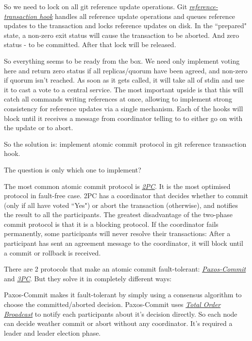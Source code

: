 \documentclass[acmlarge, screen, nonacm]{acmart}
\begin{document}
So we need to lock on all git reference update operations.
Git \emph{\href{https://git-scm.com/docs/githooks.html\#_reference_transaction}{reference-transaction hook}}
handles all reference update operations and queues reference updates to the transaction and locks reference updates on disk.
In the ``prepared" state, a non-zero exit status will cause the transaction to be aborted.
And zero status - to be committed.
After that lock will be released.

So everything seems to be ready from the box.
We need only implement voting here and return zero status if all replicas/quorum have been agreed, and non-zero if quorum isn't reached.
As soon as it gets called, it will take all
of stdin and use it to cast a vote to a central service.
The most important upside is that this will catch all commands writing
references at once, allowing to implement strong consistency for
reference updates via a single mechanism.
Each of the hooks will block until it receives a message from coordinator telling to to either go on with the update or to abort.

So the solution is: implement atomic commit protocol in git reference transaction hook.

The question is only which one to implement?

The most common atomic commit protocol is
\emph{\href{https://en.wikipedia.org/wiki/Two-phase_commit_protocol}{2PC}}.
It is the most optimised protocol in fault-free case.
2PC has a coordinator that decides whether to commit (only if all have voted ``Yes") or abort the transaction (otherwise),
and notifies the result to all the participants.
The greatest disadvantage of the two-phase commit protocol is that it is a blocking protocol.
If the coordinator fails permanently, some participants will never resolve their transactions:
After a participant has sent an agreement message to the coordinator, it will block until a commit or rollback is received.

There are 2 protocols that make an atomic commit fault-tolerant:
\emph{\href{https://dsf.berkeley.edu/cs286/papers/paxoscommit-tods2006.pdf}{Paxos-Commit}}
and
\emph{\href{https://en.wikipedia.org/wiki/Three-phase_commit_protocol}{3PC}}.
But they solve it in completely different ways:

Paxos-Commit makes it fault-tolerant by simply using a consensus
algorithm to choose the committed/aborted decision.
Paxos-Commit uses
\emph{\href{https://en.wikipedia.org/wiki/Atomic_broadcast}{Total Order Broadcast}}
to notify each participants about it's decision directly.
So each node can decide weather commit or abort without any coordinator.
It's required a leader and leader election phase.
\end{document}
